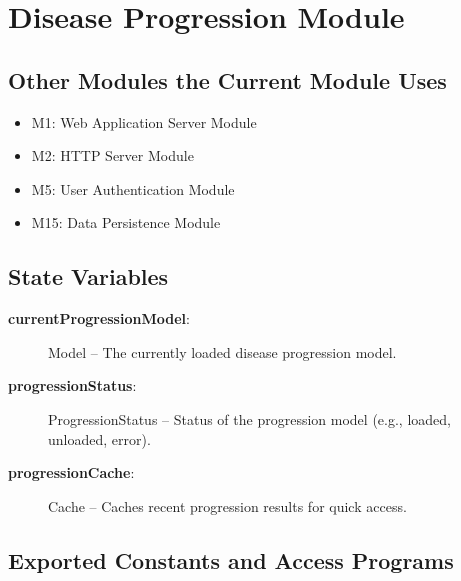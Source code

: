 \documentclass[12pt, titlepage]{article}
\begin{document}
\section{Disease Progression Module}
\label{Disease Progression Module}

\subsection{Other Modules the Current Module Uses}
\begin{itemize}
    \item M1: Web Application Server Module
    \item M2: HTTP Server Module
    \item M5: User Authentication Module
    \item M15: Data Persistence Module
\end{itemize}

\subsection{State Variables}
\begin{description}
    \item[\textbf{currentProgressionModel}:] Model -- The currently loaded disease progression model.
    \item[\textbf{progressionStatus}:] ProgressionStatus -- Status of the progression model (e.g., loaded, unloaded, error).
    \item[\textbf{progressionCache}:] Cache -- Caches recent progression results for quick access.
\end{description}

\subsection{Exported Constants and Access Programs}
\end{document}
